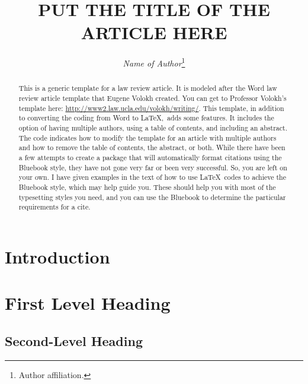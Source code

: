\documentclass[letterpaper,12pt,twoside]{article}
\title{\Large{\uppercase{Put The Title Of The Article Here}}}
\author{\large\emph{Name of Author}\thanks{Author affiliation.}}
\date{} %
\begin{document}

\maketitle
\thispagestyle{empty}

	\begin{abstract}
	This is a generic template for a law review article. It is modeled after the Word law review article template that Eugene Volokh created. You can get to Professor Volokh's template here: \url{http://www2.law.ucla.edu/volokh/writing/}. This template, in addition to converting the coding from Word to \LaTeX,~adds some features. It includes the option of having multiple authors, using a table of contents, and including an abstract. The code indicates how to modify the template for an article with multiple authors and how to remove the table of contents, the abstract, or both. While there have been a few attempts to create a package that will automatically format citations using the Bluebook style, they have not gone very far or been very successful. So, you are left on your own. I have given examples in the text of how to use \LaTeX~codes to achieve the Bluebook style, which may help guide you. These should help you with most of the typesetting styles you need, and you can use the Bluebook to determine the particular requirements for a cite.
	\end{abstract}

\tableofcontents %
\vspace{14pt}
\clearpage

\section*{Introduction}

\lipsum[1-2] %

\section{First Level Heading}

\lipsum[1]

	\begin{quote}
		\lipsum[2]
	\end{quote}

\subsection{Second-Level Heading}
\end{document}
